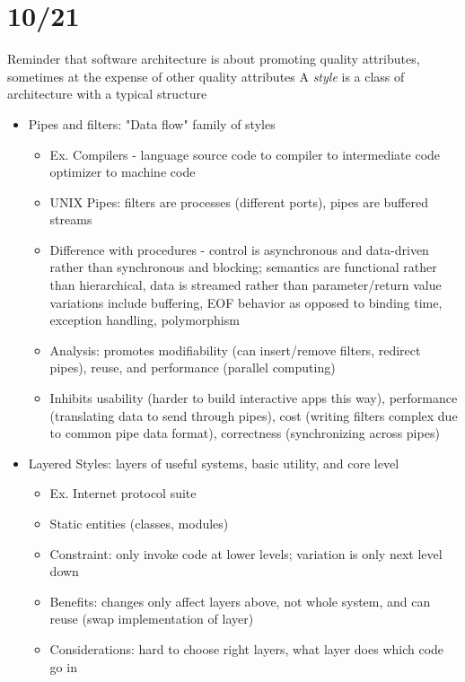\documentclass[10pt,letterpaper,unboxed,cm]{article}
\begin{document}
\section{10/21}
Reminder that software architecture is about promoting quality attributes,
sometimes at the expense of other quality attributes
A \textit{style} is a class of architecture with a typical structure
\begin{itemize}
    \item Pipes and filters: "Data flow" family of styles
    \begin{itemize}
        \item Ex. Compilers - language source code to compiler to intermediate code optimizer to machine code
        \item UNIX Pipes: filters are processes (different ports), pipes are buffered streams
        \item Difference with procedures - control is asynchronous and data-driven rather than synchronous and blocking;
        semantics are functional rather than hierarchical, data is streamed rather than parameter/return value
        variations include buffering, EOF behavior as opposed to binding time, exception handling, polymorphism
        \item Analysis: promotes modifiability (can insert/remove filters, redirect pipes), reuse, and performance (parallel computing)
        \item Inhibits usability (harder to build interactive apps this way), performance (translating data to send through pipes), cost
        (writing filters complex due to common pipe data format), correctness (synchronizing across pipes)
    \end{itemize}
    \item Layered Styles: layers of useful systems, basic utility, and core level
    \begin{itemize}
        \item Ex. Internet protocol suite
        \item Static entities (classes, modules)
        \item Constraint: only invoke code at lower levels; variation is only next level down
        \item Benefits: changes only affect layers above, not whole system, and can reuse (swap implementation of layer)
        \item Considerations: hard to choose right layers, what layer does which code go in
    \end{itemize}

\end{itemize}
\end{document}
